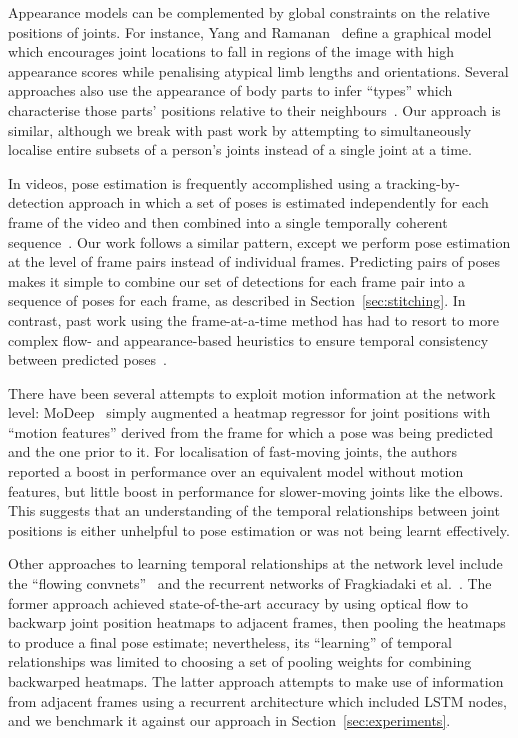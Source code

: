 \documentclass[runningheads]{llncs}
\begin{document}
Appearance models can be complemented by global constraints on the relative
positions of joints. For instance, Yang and Ramanan~\cite{yang2011articulated}
define a graphical model which encourages joint locations to fall in regions of
the image with high appearance scores while penalising atypical limb lengths and
orientations. Several approaches also use the appearance of body parts to infer
``types'' which characterise those parts' positions relative to their
neighbours~\cite{yang2011articulated,chen2014articulated}. Our approach is
similar, although we break with past work by attempting to simultaneously
localise entire subsets of a person's joints instead of a single joint at a
time.

In videos, pose estimation is frequently accomplished using a
tracking-by-detection approach in which a set of poses is estimated
independently for each frame of the video and then combined into a single
temporally coherent
sequence~\cite{andriluka2010monocular,ferrari2008progressive,cherian2014mixing,ramanan2005strike}.
Our work follows a similar pattern, except we perform pose estimation at the
level of frame pairs instead of individual frames. Predicting pairs of poses
makes it simple to combine our set of detections for each frame pair into a
sequence of poses for each frame, as described in Section~\ref{sec:stitching}.
In contrast, past work using the frame-at-a-time method has had to resort to
more complex flow- and appearance-based heuristics to ensure temporal
consistency between predicted poses~\cite{cherian2014mixing}.

There have been several attempts to exploit motion information at the network
level: MoDeep~\cite{jain2014modeep} simply augmented a heatmap regressor for
joint positions with ``motion features'' derived from the frame for which a pose
was being predicted and the one prior to it. For localisation of fast-moving
joints, the authors reported a boost in performance over an equivalent model
without motion features, but little boost in performance for slower-moving
joints like the elbows. This suggests that an understanding of the temporal
relationships between joint positions is either unhelpful to pose estimation or
was not being learnt effectively.

Other approaches to learning temporal relationships at the network level include
the ``flowing convnets''~\cite{pfister2015flowing} and the recurrent networks of
Fragkiadaki et al.~\cite{fragkiadaki2015recurrent}. The former approach achieved
state-of-the-art accuracy by using optical flow to backwarp joint position
heatmaps to adjacent frames, then pooling the heatmaps to produce a final pose
estimate; nevertheless, its ``learning'' of temporal relationships was limited
to choosing a set of pooling weights for combining backwarped heatmaps. The
latter approach attempts to make use of information from adjacent frames using
a recurrent architecture which included LSTM nodes, and we benchmark it against
our approach in Section~\ref{sec:experiments}.
\end{document}
